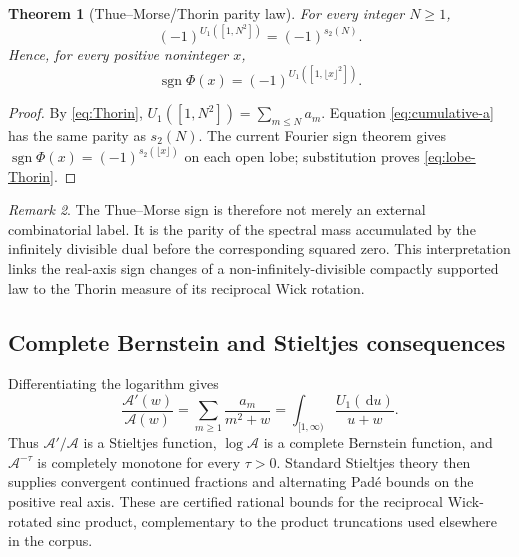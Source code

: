 \documentclass[11pt,oneside]{article}
\newtheorem{theorem}{Theorem}[section]
\theoremstyle{definition}
\theoremstyle{remark}
\newtheorem{remark}[theorem]{Remark}
\newcommand{\dd}{\,\mathrm d}
\newcommand{\sgn}{\operatorname{sgn}}
\begin{document}
\begin{theorem}[Thue--Morse/Thorin parity law]\label{thm:Thorin-parity}
For every integer $N\ge1$,
\begin{equation}\label{eq:Thorin-parity}
 \boxed{
 (-1)^{U_1([1,N^2])}=(-1)^{s_2(N)}.}
\end{equation}
Hence, for every positive noninteger $x$,
\begin{equation}\label{eq:lobe-Thorin}
 \boxed{
 \sgn\Phi(x)=(-1)^{U_1([1,\lfloor x\rfloor^2])}.}
\end{equation}
\end{theorem}

\begin{proof}
By \cref{eq:Thorin}, $U_1([1,N^2])=\sum_{m\le N}a_m$.
Equation \cref{eq:cumulative-a} has the same parity as $s_2(N)$.  The current
Fourier sign theorem gives
$\sgn\Phi(x)=(-1)^{s_2(\lfloor x\rfloor)}$ on each open lobe; substitution
proves \cref{eq:lobe-Thorin}.
\end{proof}

\begin{remark}
The Thue--Morse sign is therefore not merely an external combinatorial label.
It is the parity of the spectral mass accumulated by the infinitely divisible
dual before the corresponding squared zero.  This interpretation links the
real-axis sign changes of a non-infinitely-divisible compactly supported law to
the Thorin measure of its reciprocal Wick rotation.
\end{remark}

\subsection{Complete Bernstein and Stieltjes consequences}

Differentiating the logarithm gives
\begin{equation}\label{eq:Stieltjes-logderivative}
 \frac{\mathcal A'(w)}{\mathcal A(w)}
 =\sum_{m\ge1}\frac{a_m}{m^2+w}
 =\int_{[1,\infty)}\frac{U_1(\dd u)}{u+w}.
\end{equation}
Thus $\mathcal A'/\mathcal A$ is a Stieltjes function,
$\log\mathcal A$ is a complete Bernstein function, and
$\mathcal A^{-\tau}$ is completely monotone for every $\tau>0$.  Standard
Stieltjes theory then supplies convergent continued fractions and alternating
Pad\'e bounds on the positive real axis.  These are certified rational bounds
for the reciprocal Wick-rotated sinc product, complementary to the product
truncations used elsewhere in the corpus.
\end{document}
